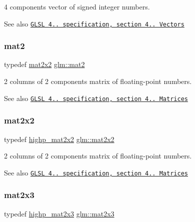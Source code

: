 4 components vector of signed integer numbers.

\begin{DoxySeeAlso}{See also}
\href{http://www.opengl.org/registry/doc/GLSLangSpec.4.20.8.pdf}{\tt G\+L\+SL 4.. specification, section 4.. Vectors} 
\end{DoxySeeAlso}
\mbox{\label{group__core__types_ga8357ec0aab6f8cf69313592492663c3f}} 
\subsubsection{\texorpdfstring{mat2}{mat2}}
{\footnotesize\ttfamily typedef \hyperlink{group__core__types_gaeddc14adb4963d9bad73866cc202fb40}{mat2x2} \hyperlink{group__core__types_ga8357ec0aab6f8cf69313592492663c3f}{glm\+::mat2}}

2 columns of 2 components matrix of floating-\/point numbers.

\begin{DoxySeeAlso}{See also}
\href{http://www.opengl.org/registry/doc/GLSLangSpec.4.20.8.pdf}{\tt G\+L\+SL 4.. specification, section 4.. Matrices} 
\end{DoxySeeAlso}
\mbox{\label{group__core__types_gaeddc14adb4963d9bad73866cc202fb40}} 
\subsubsection{\texorpdfstring{mat2x2}{mat2x2}}
{\footnotesize\ttfamily typedef \hyperlink{group__core__precision_ga20b66861ebdfa14586f4028c5ef16d2e}{highp\+\_\+mat2x2} \hyperlink{group__core__types_gaeddc14adb4963d9bad73866cc202fb40}{glm\+::mat2x2}}

2 columns of 2 components matrix of floating-\/point numbers.

\begin{DoxySeeAlso}{See also}
\href{http://www.opengl.org/registry/doc/GLSLangSpec.4.20.8.pdf}{\tt G\+L\+SL 4.. specification, section 4.. Matrices} 
\end{DoxySeeAlso}
\mbox{\label{group__core__types_gaea02797b8231f6dd9380345f6ff12155}} 
\subsubsection{\texorpdfstring{mat2x3}{mat2x3}}
{\footnotesize\ttfamily typedef \hyperlink{group__core__precision_ga96ec9c154598fcc1c113d9ebd3680097}{highp\+\_\+mat2x3} \hyperlink{group__core__types_gaea02797b8231f6dd9380345f6ff12155}{glm\+::mat2x3}}


